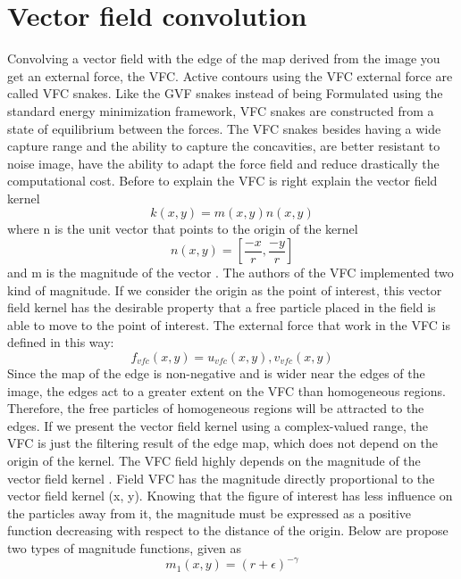 \section{Vector field convolution}
Convolving a vector field with the edge of the map derived from the image you get an external force, the VFC. Active contours using the VFC external force are called VFC snakes. Like the GVF snakes instead of being Formulated using the standard energy minimization framework, VFC snakes are constructed from a state of equilibrium between the forces. The VFC snakes besides having a wide capture range and the ability to capture the concavities, are better resistant to noise image, have the ability to adapt the force field and reduce drastically the computational cost.
Before to explain the VFC is right explain the vector field kernel
\begin{equation}
 k ( x,y ) =m(x,y)n(x,y)
\end{equation}
where n is the unit vector that points to the origin of the kernel	
\begin{equation}
n ( x,y ) = [\frac{-x}{r} , \frac{-y}{r} ]
\end{equation}
and m is the magnitude of the vector . The authors of the VFC implemented two kind of magnitude. If we consider the origin as the point of interest, this vector field kernel has the desirable property that a free particle placed in the field is able to move to the point of interest. The external force that work in the VFC is defined in this way:
\begin{equation}
{f} _{vfc} ( x,y ) = {u} _{vfc} ( x,y ) , {v} _{vfc} (x,y)
\end{equation}
Since the map of the edge is non-negative and is wider near the edges of the image, the edges act to a greater extent on the VFC than homogeneous regions. Therefore, the free particles of homogeneous regions will be attracted to the edges. If we present the vector field kernel using a complex-valued range, the VFC is just the filtering result of the edge map, which does not depend on the origin of the kernel. The VFC field highly depends on the magnitude of the vector field kernel . Field VFC has the magnitude directly proportional to the vector field kernel (x, y). Knowing that the figure of interest has less influence on the particles away from it, the magnitude must be expressed as a positive function decreasing with respect to the distance of the origin. Below are propose two types of magnitude functions, given as
\begin{equation}
{m} _{1} ( x,y ) =(r+\epsilon) ^{-\gamma}
\end{equation}
